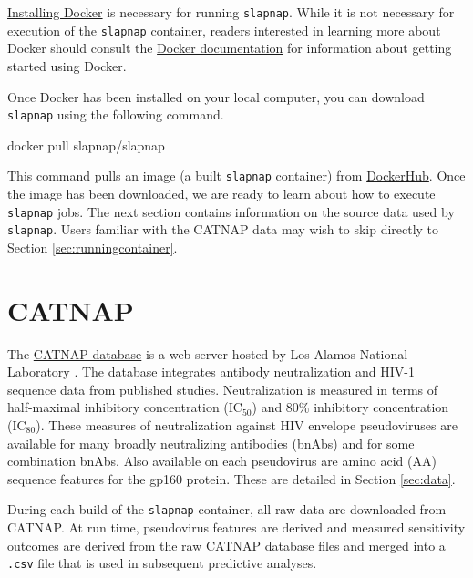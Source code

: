 \documentclass[]{article}
\newenvironment{Shaded}{\begin{snugshade}}{\end{snugshade}}
\newcommand{\ExtensionTok}[1]{#1}
\newcommand{\NormalTok}[1]{#1}
\begin{document}
\href{https://docs.docker.com/docker-for-windows/install/}{Installing
Docker} is necessary for running \texttt{slapnap}. While it is not
necessary for execution of the \texttt{slapnap} container, readers
interested in learning more about Docker should consult the
\href{https://docs.docker.com/get-started/}{Docker documentation} for
information about getting started using Docker.

Once Docker has been installed on your local computer, you can download
\texttt{slapnap} using the following command.

\begin{Shaded}
\begin{Highlighting}[]
\ExtensionTok{docker}\NormalTok{ pull slapnap/slapnap}
\end{Highlighting}
\end{Shaded}

This command pulls an image (a built \texttt{slapnap} container) from
\href{https://hub.docker.com/}{DockerHub}. Once the image has been
downloaded, we are ready to learn about how to execute \texttt{slapnap}
jobs. The next section contains information on the source data used by
\texttt{slapnap}. Users familiar with the CATNAP data may wish to skip
directly to Section \ref{sec:runningcontainer}.

\section{CATNAP}\label{sec:catnap}

The
\href{https://www.hiv.lanl.gov/components/sequence/HIV/neutralization/index.html}{CATNAP
database} is a web server hosted by Los Alamos National Laboratory
\citep{yoon2015catnap}. The database integrates antibody neutralization
and HIV-1 sequence data from published studies. Neutralization is
measured in terms of half-maximal inhibitory concentration (IC\(_{50}\))
and 80\% inhibitory concentration (IC\(_{80}\)). These measures of
neutralization against HIV envelope pseudoviruses are available for many
broadly neutralizing antibodies (bnAbs) and for some combination bnAbs.
Also available on each pseudovirus are amino acid (AA) sequence features
for the gp160 protein. These are detailed in Section \ref{sec:data}.

During each build of the \texttt{slapnap} container, all raw data are
downloaded from CATNAP. At run time, pseudovirus features are derived
and measured sensitivity outcomes are derived from the raw CATNAP
database files and merged into a \texttt{.csv} file that is used in
subsequent predictive analyses.
\end{document}
